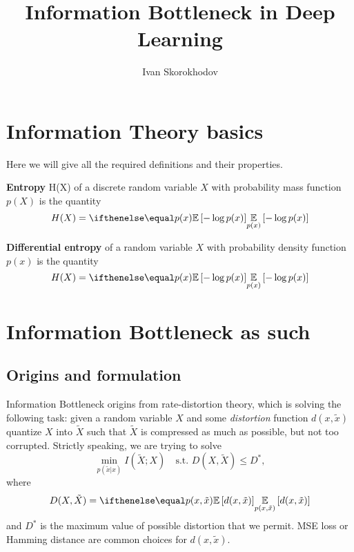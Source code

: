 \documentclass{article}
\title{Information Bottleneck in Deep Learning}
\author{Ivan Skorokhodov}
\begin{document}

\section{Information Theory basics}
Here we will give all the required definitions and their properties.

\begin{definition}
\textbf{Entropy} H(X) of a discrete random variable $X$ with probability mass function $p(X)$ is the quantity
\[
H(X) = \expect[p(x)]{-\log p(x)}
\]
\end{definition}

\begin{definition}
\textbf{Differential entropy} of a random variable $X$ with probability density function $p(x)$ is the quantity
\[
H(X) = \expect[p(x)]{-\log p(x)}
\]
\end{definition}


\section{Information Bottleneck as such}
\subsection{Origins and formulation}
Information Bottleneck origins from rate-distortion theory, which is solving the following task: given a random variable $X$ and some \textit{distortion} function $d(x,\tilde{x})$ quantize $X$ into $\tilde{X}$ such that $\tilde{X}$ is compressed as much as possible, but not too corrupted.
Strictly speaking, we are trying to solve
\[
\min_{p(\tilde{x} | x)} I(\tilde{X}; X) \quad \text{s.t. } D(X, \tilde{X}) \leq D^*,
\]
where
\[
D(X, \tilde{X}) = \expect[p(x, \tilde{x})]{d(x, \tilde{x})}
\]
and $D^*$ is the maximum value of possible distortion that we permit.
MSE loss or Hamming distance are common choices for $d(x, \tilde{x})$.


%

\end{document}
